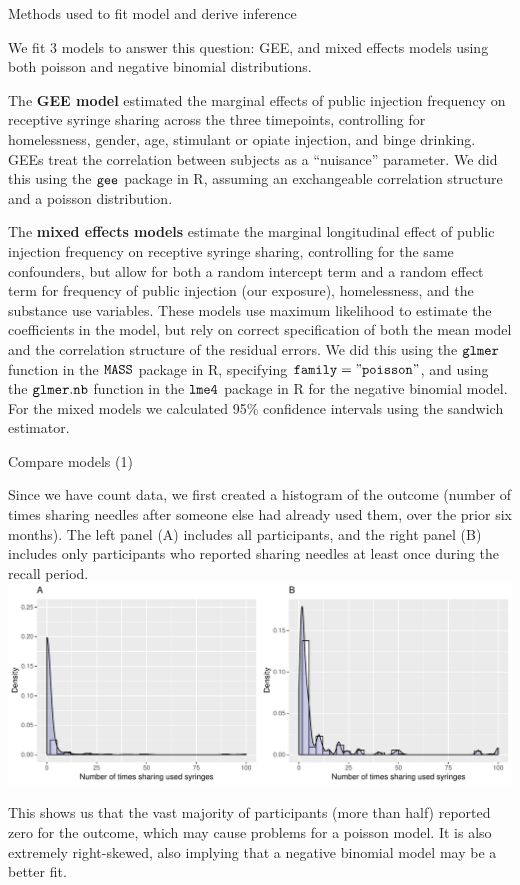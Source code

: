 \documentclass[ignorenonframetext,]{beamer}
\begin{document}
\begin{frame}{Methods used to fit model and derive inference}

\footnotesize
We fit 3 models to answer this question: GEE, and mixed effects models
using both poisson and negative binomial distributions.

The \textbf{GEE model} estimated the marginal effects of public
injection frequency on receptive syringe sharing across the three
timepoints, controlling for homelessness, gender, age, stimulant or
opiate injection, and binge drinking. GEEs treat the correlation between
subjects as a ``nuisance'' parameter. We did this using the \(\tt{gee}\)
package in R, assuming an exchangeable correlation structure and a
poisson distribution.

The \textbf{mixed effects models} estimate the marginal longitudinal
effect of public injection frequency on receptive syringe sharing,
controlling for the same confounders, but allow for both a random
intercept term and a random effect term for frequency of public
injection (our exposure), homelessness, and the substance use variables.
These models use maximum likelihood to estimate the coefficients in the
model, but rely on correct specification of both the mean model and the
correlation structure of the residual errors. We did this using the
\(\tt{glmer}\) function in the \(\tt{MASS}\) package in R, specifying
\(\tt{family = "poisson"}\), and using the \(\tt{glmer.nb}\) function in
the \(\tt{lme4}\) package in R for the negative binomial model. For the
mixed models we calculated 95\% confidence intervals using the sandwich
estimator.

\normalsize

\end{frame}

\begin{frame}{Compare models (1)}

\small
Since we have count data, we first created a histogram of the outcome
(number of times sharing needles after someone else had already used
them, over the prior six months). The left panel (A) includes all
participants, and the right panel (B) includes only participants who
reported sharing needles at least once during the recall period.
\includegraphics{Final_project_slides_files/figure-beamer/hist-1.pdf}

This shows us that the vast majority of participants (more than half)
reported zero for the outcome, which may cause problems for a poisson
model. It is also extremely right-skewed, also implying that a negative
binomial model may be a better fit.

\end{frame}
\end{document}
